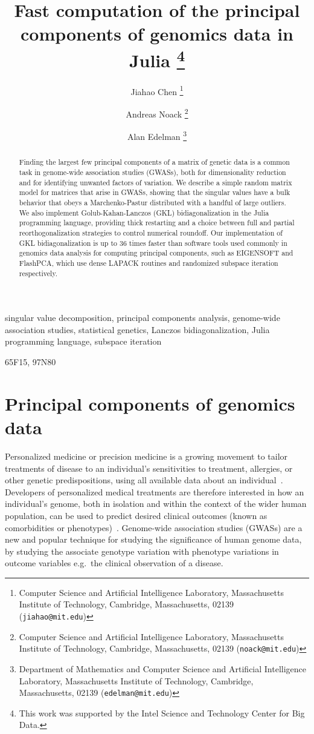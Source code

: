\documentclass[review]{siamart0516}
\title{Fast computation of the principal components of genomics data in Julia
    \thanks{This
        work was supported by the Intel Science and Technology Center for Big Data.
	}}
\author{%
    Jiahao Chen
    \thanks{Computer Science and Artificial Intelligence Laboratory,
           Massachusetts Institute of Technology,
           Cambridge, Massachusetts, 02139 ({\tt jiahao@mit.edu})}
    \and
    Andreas Noack
    \thanks{Computer Science and Artificial Intelligence Laboratory,
            Massachusetts Institute of Technology,
            Cambridge, Massachusetts, 02139 ({\tt noack@mit.edu})}
    \and
    Alan Edelman
    \thanks{Department of Mathematics and Computer Science and Artificial Intelligence Laboratory,
            Massachusetts Institute of Technology,
            Cambridge, Massachusetts, 02139 ({\tt edelman@mit.edu})}
}
\begin{document}
\maketitle

\tableofcontents

\begin{abstract}
Finding the largest few principal components of a matrix of genetic data is a
common task in genome-wide association studies (GWASs), both for dimensionality
reduction and for identifying unwanted factors of variation.
We describe a simple random matrix model for matrices that arise in GWASs,
showing that the singular values have a bulk behavior that obeys a
Marchenko-Pastur distributed with a handful of large outliers.
We also implement Golub-Kahan-Lanczos (GKL) bidiagonalization in the Julia
programming language, providing thick restarting and a choice between full
and partial reorthogonalization strategies to control numerical roundoff.
Our implementation of GKL bidiagonalization is up to 36 times faster than
software tools used commonly in genomics data analysis for computing principal
components, such as EIGENSOFT and FlashPCA, which use dense LAPACK routines
and randomized subspace iteration respectively.
\end{abstract}

\begin{keywords}
    singular value decomposition,
    principal components analysis,
    genome-wide association studies,
    statistical genetics,
    Lanczos bidiagonalization,
    Julia programming language,
    subspace iteration
\end{keywords}

\begin{AMS}
    65F15, 97N80
\end{AMS}

\pagestyle{myheadings}
\thispagestyle{plain}

\section{Principal components of genomics data}

Personalized medicine or precision medicine is a growing movement to tailor treatments of disease
to an individual's sensitivities to treatment, allergies, or other genetic
predispositions, using all available data about an individual~\cite{Desmond2012}.
Developers of personalized medical treatments are therefore interested in how an
individual's genome, both in isolation and within the context of the wider human
population, can be used to predict desired clinical outcomes (known as
comorbidities or phenotypes)~\cite[Ch. 8]{Laird2011}.
Genome-wide association studies (GWASs) are a new and popular technique for
studying the significance of human genome data, by studying the associate genotype
variation with phenotype variations in outcome variables e.g.\ the clinical
observation of a disease.
\end{document}
